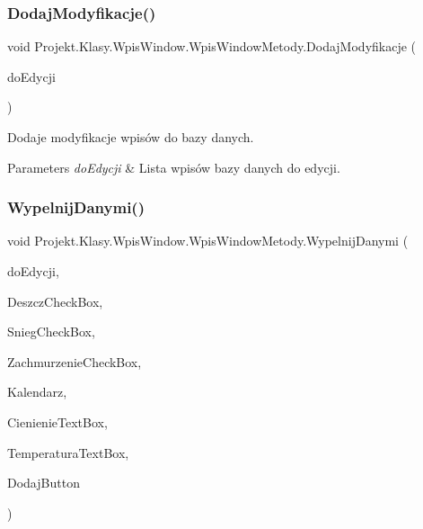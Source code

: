 \subsubsection{\texorpdfstring{DodajModyfikacje()}{DodajModyfikacje()}}
{\footnotesize\ttfamily void Projekt.\+Klasy.\+Wpis\+Window.\+Wpis\+Window\+Metody.\+Dodaj\+Modyfikacje (\begin{DoxyParamCaption}\item[{List$<$ \mbox{\hyperlink{class_projekt_1_1_baza_1_1_pogoda}{Pogoda}} $>$}]{do\+Edycji }\end{DoxyParamCaption})}





Dodaje modyfikacje wpisów do bazy danych. 


\begin{DoxyParams}{Parameters}
{\em do\+Edycji} & Lista wpisów bazy danych do edycji.\\
\hline
\end{DoxyParams}
\mbox{\label{class_projekt_1_1_klasy_1_1_wpis_window_1_1_wpis_window_metody_a8d36f2b484338666ab870d6c0cfd3ba4}} 
\subsubsection{\texorpdfstring{WypelnijDanymi()}{WypelnijDanymi()}}
{\footnotesize\ttfamily void Projekt.\+Klasy.\+Wpis\+Window.\+Wpis\+Window\+Metody.\+Wypelnij\+Danymi (\begin{DoxyParamCaption}\item[{List$<$ \mbox{\hyperlink{class_projekt_1_1_baza_1_1_pogoda}{Pogoda}} $>$}]{do\+Edycji,  }\item[{Check\+Box}]{Deszcz\+Check\+Box,  }\item[{Check\+Box}]{Snieg\+Check\+Box,  }\item[{Check\+Box}]{Zachmurzenie\+Check\+Box,  }\item[{Calendar}]{Kalendarz,  }\item[{Text\+Box}]{Cienienie\+Text\+Box,  }\item[{Text\+Box}]{Temperatura\+Text\+Box,  }\item[{Button}]{Dodaj\+Button }\end{DoxyParamCaption})}




